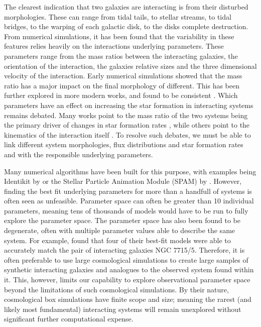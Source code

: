 The clearest indication that two galaxies are interacting is from their disturbed morphologies. These can range from tidal tails, to stellar streams, to tidal bridges, to the warping of each galactic disk, to the disks complete destruction. From numerical simulations, it has been found that the variability in these features relies heavily on the interactions underlying parameters. These parameters range from the mass ratios between the interacting galaxies, the orientation of the interaction, the galaxies relative sizes and the three dimensional velocity of the interaction. Early numerical simulations \citep[e.g][]{1972ApJ...178..623T, 1978MNRAS.184..185W, 1990AJ....100.1477W, 1993ApJS...86..389H} showed that the mass ratio has a major impact on the final morphology of different. This has been further explored in more modern works, and found to be consistent \citep{2005A&A...437...69B, 2008MNRAS.391.1137L, 2012ApJ...747...85X, 2023PASJ...75..986T}. Which parameters have an effect on increasing the star formation in interacting systems remains debated. Many works point to the mass ratio of the two systems being the primary driver of changes in star formation rates \citep{2015MNRAS.454.1742K, 2022MNRAS.516.4922R, 2023ApJ...953...91L}, while others point to the kinematics of the interaction itself \citep{2020MNRAS.499.4370M, 2021ApJ...918...55X}. To resolve such debates, we must be able to link different system morphologies, flux distributions and star formation rates and with the responsible underlying parameters.

Many numerical algorithms have been built for this purpose, with examples being Identikit by \citet{2009AJ....137.3071B} or the Stellar Particle Animation Module (SPAM) by \citet{1990AJ....100.1477W}. However, finding the best fit underlying parameters for more than a handfull of systems is often seen as unfeasible. Parameter space can often be greater than 10 individual parameters, meaning tens of thousands of models would have to be run to fully explore the parameter space. The parameter space has also been found to be degenerate, often with multiple parameter values able to describe the same system. For example, \citet{2010ASPC..423..227S} found that four of their best-fit models were able to accurately match the pair of interacting galaxies NGC 7715/5. Therefore, it is often preferable to use large cosmological simulations \citep[e.g.][]{2015MNRAS.446..521S, 2018MNRAS.480..800H,2020MNRAS.493.3716H} to create large samples of synthetic interacting galaxies and analogues to the observed system found within it. This, however, limits our capability to explore observational parameter space beyond the limitations of such cosmological simulations. By their nature, cosmological box simulations have finite scope and size; meaning the rarest (and likely most fundamental) interacting systems will remain unexplored without significant further computational expense.

